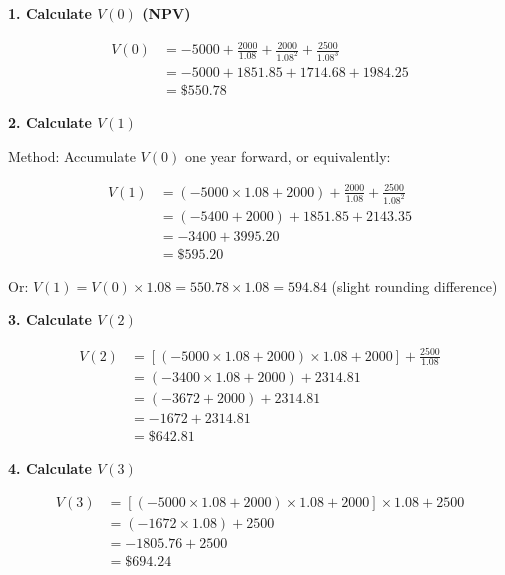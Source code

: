 \documentclass[
  letterpaper,
]{scrbook}
\begin{document}
\begin{tcolorbox}[enhanced jigsaw, toptitle=1mm, colbacktitle=quarto-callout-tip-color!10!white, opacityback=0, leftrule=.75mm, breakable, colframe=quarto-callout-tip-color-frame, toprule=.15mm, opacitybacktitle=0.6, coltitle=black, bottomrule=.15mm, colback=white, arc=.35mm, titlerule=0mm, rightrule=.15mm, left=2mm, title={Click to reveal solution}, bottomtitle=1mm]

\textbf{1. Calculate \(V(0)\) (NPV)}

\[
\begin{aligned}
V(0) &= -5000 + \frac{2000}{1.08} + \frac{2000}{1.08^2} + \frac{2500}{1.08^3} \\
&= -5000 + 1851.85 + 1714.68 + 1984.25 \\
&= \$550.78
\end{aligned}
\]

\textbf{2. Calculate \(V(1)\)}

Method: Accumulate \(V(0)\) one year forward, or equivalently:

\[
\begin{aligned}
V(1) &= (-5000 \times 1.08 + 2000) + \frac{2000}{1.08} + \frac{2500}{1.08^2} \\
&= (-5400 + 2000) + 1851.85 + 2143.35 \\
&= -3400 + 3995.20 \\
&= \$595.20
\end{aligned}
\]

Or: \(V(1) = V(0) \times 1.08 = 550.78 \times 1.08 = 594.84\) (slight
rounding difference)

\textbf{3. Calculate \(V(2)\)}

\[
\begin{aligned}
V(2) &= [(-5000 \times 1.08 + 2000) \times 1.08 + 2000] + \frac{2500}{1.08} \\
&= (-3400 \times 1.08 + 2000) + 2314.81 \\
&= (-3672 + 2000) + 2314.81 \\
&= -1672 + 2314.81 \\
&= \$642.81
\end{aligned}
\]

\textbf{4. Calculate \(V(3)\)}

\[
\begin{aligned}
V(3) &= [(-5000 \times 1.08 + 2000) \times 1.08 + 2000] \times 1.08 + 2500 \\
&= (-1672 \times 1.08) + 2500 \\
&= -1805.76 + 2500 \\
&= \$694.24
\end{aligned}
\]


\end{tcolorbox}
\end{document}
